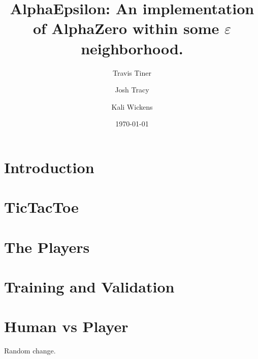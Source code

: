 \documentclass[11pt]{article}
\title{AlphaEpsilon: An implementation of AlphaZero within some $\varepsilon$ neighborhood.}
\author{Travis Tiner}
\author{Josh Tracy}
\author{Kali Wickens}
\affil{University of Utah -- Deep Learning}
\date{\today}
\begin{document}
\maketitle

\section{Introduction}

	

\section{TicTacToe}

	

\section{The Players}

	
	
	

\section{Training and Validation}

	

\section{Human vs Player}

	

	Random change.

%
%
%
%
%
\end{document}
